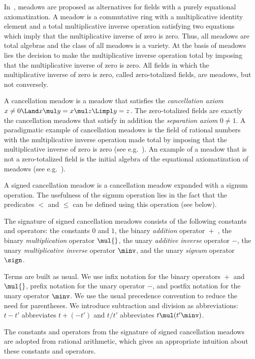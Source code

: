 \documentclass{llncs}
\begin{document}
In~\cite{BT07a}, meadows are proposed as alternatives for fields with a
purely equational axiomatization.
A meadow is a commutative ring with a multiplicative identity element
and a total multiplicative inverse operation satisfying two equations
which imply that the multiplicative inverse of zero is zero.
Thus, all meadows are total algebras and the class of all meadows is a 
variety.
At the basis of meadows lies the decision to make the multiplicative 
inverse operation total by imposing that the multiplicative inverse of 
zero is zero.
All fields in which the multiplicative inverse of zero is zero, called
zero-totalized fields, are meadows, but not conversely.

A cancellation meadow is a meadow that satisfies the 
\emph{cancellation axiom} 
$ x \neq 0 \Land x \mul y = x \mul z \Limpl y = z$.
The zero-totalized fields are exactly the cancellation meadows that
satisfy in addition the \emph{separation axiom} $0 \neq 1$.
A paradigmatic example of cancellation meadows is the field of rational
numbers with the multiplicative inverse operation made total by imposing
that the multiplicative inverse of zero is zero (see e.g.~\cite{BT07a}).
An example of a meadow that is not a zero-totalized field is the initial
algebra of the equational axiomatization of meadows 
(see e.g.~\cite{BHT09a}).

A signed cancellation meadow is a cancellation meadow expanded with a
signum operation.
The usefulness of the signum operation lies in the fact that the 
predicates $<$ and $\leq$ can be defined using this operation 
(see below).

The signature of signed cancellation meadows consists of the following
constants and operators:
the constants $0$ and $1$,
the binary \emph{addition} operator ${} +$ {},
the binary \emph{multiplication} operator ${} \mul {}$,
the unary \emph{additive inverse} operator $- {}$,
the unary \emph{multiplicative inverse} operator ${}\minv$, and
the unary \emph{signum} operator $\sign$.

Terms are built as usual.
We use infix notation for the binary operators ${} + {}$ and
${} \mul {}$, prefix notation for the unary operator $- {}$, and postfix
notation for the unary operator ${}\minv$.
We use the usual precedence convention to reduce the need for
parentheses.
We introduce subtraction and division as abbreviations:
$t - t'$ abbreviates $t + (-t')$ and
$t / t'$ abbreviates $t \mul ({t'}\minv)$.

The constants and operators from the signature of signed cancellation
meadows are adopted from rational arithmetic, which gives an appropriate
intuition about these constants and operators.
\end{document}
